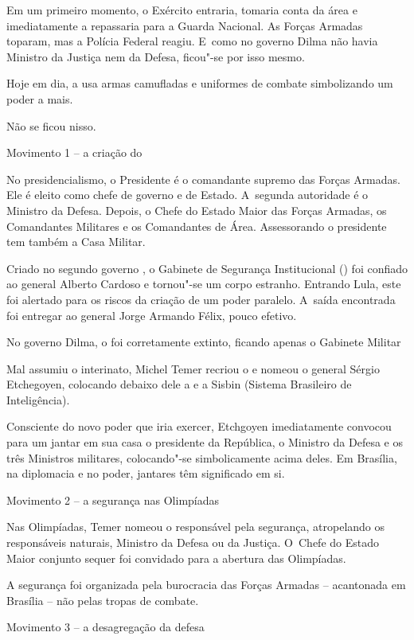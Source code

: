 Em um primeiro momento, o Exército entraria, tomaria conta da área e
imediatamente a repassaria para a Guarda Nacional. As Forças Armadas
toparam, mas a Polícia Federal reagiu. E~como no governo Dilma não havia
Ministro da Justiça nem da Defesa, ficou"-se por isso mesmo.

Hoje em dia, a  usa armas camufladas e uniformes de combate
simbolizando um poder a mais.

Não se ficou nisso.

Movimento 1 -- a criação do 

No presidencialismo, o Presidente é o comandante supremo das Forças
Armadas. Ele é eleito como chefe de governo e de Estado. A~segunda
autoridade é o Ministro da Defesa. Depois, o Chefe do Estado Maior das
Forças Armadas, os Comandantes Militares e os Comandantes de Área.
Assessorando o presidente tem também a Casa Militar.

Criado no segundo governo , o Gabinete de Segurança Institucional
() foi confiado ao general Alberto Cardoso e tornou"-se um corpo
estranho. Entrando Lula, este foi alertado para os riscos da criação de
um poder paralelo. A~saída encontrada foi entregar ao general Jorge
Armando Félix, pouco efetivo.

No governo Dilma, o  foi corretamente extinto, ficando apenas o
Gabinete Militar

Mal assumiu o interinato, Michel Temer recriou o  e nomeou o general
Sérgio Etchegoyen, colocando debaixo dele a  e a Sisbin (Sistema
Brasileiro de Inteligência).

Consciente do novo poder que iria exercer, Etchgoyen imediatamente
convocou para um jantar em sua casa o presidente da República, o
Ministro da Defesa e os três Ministros militares, colocando"-se
simbolicamente acima deles. Em Brasília, na diplomacia e no poder,
jantares têm significado em si.

Movimento 2 -- a segurança nas Olimpíadas

Nas Olimpíadas, Temer nomeou o  responsável pela segurança,
atropelando os responsáveis naturais, Ministro da Defesa ou da Justiça.
O~Chefe do Estado Maior conjunto sequer foi convidado para a abertura
das Olimpíadas.

A segurança foi organizada pela burocracia das Forças Armadas --
acantonada em Brasília -- não pelas tropas de combate.

Movimento 3 -- a desagregação da defesa

